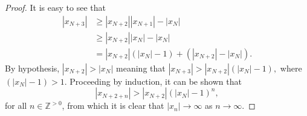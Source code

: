 \documentclass[10pt,a4paper]{amsart}
\newcommand{\Zp}{\mathbb{Z}^{>0}}
\begin{document}
\begin{proof}
	It is easy to see that 
	\begin{align*}
	|x_{N+3}|&\geq |x_{N+2}||x_{N+1}|-|x_N| \\
	&\geq |x_{N+2}||x_{N}|-|x_N| \\
	& = |x_{N+2}|(|x_{N}|-1)+(|x_{N+2}|-|x_N|).
	\end{align*}
	By hypothesis, $|x_{N+2}|>|x_N|$ meaning that $|x_{N+3}|>|x_{N+2}|(|x_{N}|-1),$
	where $(|x_{N}|-1)>1$. Proceeding by induction, it can be shown that
	\begin{equation}
		|x_{N+2+n}|>|x_{N+2}|(|x_{N}|-1)^n,
	\end{equation}
	for all $n\in\Zp$, from which it is clear that $|x_n|\to\infty$ as $n\to\infty$.
\end{proof}
\end{document}

